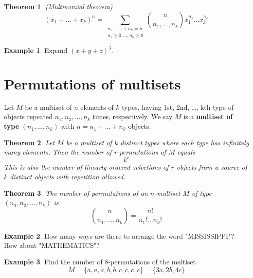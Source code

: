 \documentclass[addpoints]{exam}
\newtheorem{theorem}{Theorem}[section]
\theoremstyle{definition}
\newtheorem{exmp}{Example}[section]
\begin{document}
\begin{theorem}
	(Multinomial theorem)	
	\begin{equation*}
		(x_1 + \ldots + x_k)^n = \sum_{\substack{n_1+\ldots+n_k=n \\ n_1\geq 0,\ldots,n_k\geq 0}} \binom{n}{n_1,\ldots,n_k} x_1^{n_1}\ldots x_k^{n_k}
	\end{equation*}
\end{theorem}

\begin{exmp}
	Expand $(x + y + z)^3$.
\end{exmp}

\section{Permutations of multisets}
Let $M$ be a multiset of $n$ elements of $k$ types, having 1st, 2nd, \ldots, kth type of objects repeated $n_1, n_2, \ldots, n_k$ times, respectively. We say $M$ is a \textbf{multiset of type} $(n_1,\ldots,n_k)$ with $n = n_1 + \ldots + n_k$ objects.
\begin{theorem}
	Let $M$ be a multiset of $k$ distinct types where each type has infinitely many elements. Then the number of r-permutations of $M$ equals
	\begin{equation*}
		k^r
	\end{equation*}
This is also the number of linearly ordered selections of $r$ objects from a source of $k$ distinct objects with repetition allowed.
\end{theorem}
\begin{theorem}
	The number of permutations of an $n$-multiset $M$ of type $(n_1,n_2,\ldots,n_k)$ is
	\begin{equation*}
		\binom{n}{n_1,\ldots,n_k} = \frac{n!}{n_1!\ldots n_k!}
	\end{equation*}
\end{theorem}
\begin{exmp}
	How many ways are there to arrange the word "MISSISSIPPI"? How about "MATHEMATICS"?
\end{exmp}
\begin{exmp}
	Find the number of 8-permutations of the multiset
	\begin{equation*}
		M = \{a, a, a, b, b, c, c, c, c\} = \{3a, 2b, 4c\}
	\end{equation*}
\end{exmp}
\end{document}
